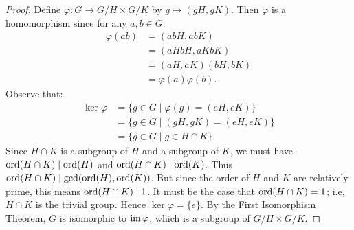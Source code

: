 \documentclass[10pt,twoside,openany]{memoir}
\begin{document}
    \begin{proof}
        Define $\varphi:G \rightarrow G/H \times G/K$ by $g \mapsto (gH,gK)$. Then $\varphi$ is a homomorphism since for any $a,b \in G$:
            \begin{equation*}
            \begin{split}
                \varphi(ab)
                & = (abH,abK) \\
                & = (aHbH,aKbK) \\
                & = (aH,aK)(bH,bK) \\
                & = \varphi(a)\varphi(b).
            \end{split}
            \end{equation*}
        Observe that:
            \begin{equation*}
            \begin{split}
                \ker \varphi 
                & = \{g \in G \mid \varphi(g) = (eH,eK)\} \\
                & = \{g \in G \mid (gH,gK) = (eH,eK)\} \\
                & = \{g \in G \mid g \in H \cap K\}.
            \end{split}
            \end{equation*}
        Since $H \cap K$ is a subgroup of $H$ and a subgroup of $K$, we must have $\operatorname{ord}(H \cap K) \mid \operatorname{ord}(H)$ and $\operatorname{ord}(H \cap K) \mid \operatorname{ord}(K)$. Thus $\operatorname{ord}(H \cap K) \mid \gcd(\operatorname{ord}(H),\operatorname{ord}(K))$. But since the order of $H$ and $K$ are relatively prime, this means $\operatorname{ord}(H \cap K) \mid 1$. It must be the case that $\operatorname{ord}(H \cap K) = 1$; i.e, $H \cap K$ is the trivial group. Hence $\ker \varphi = \{e\}$. By the First Isomorphism Theorem, $G$ is isomorphic to $\operatorname{im}\varphi$, which is a subgroup of $G/H \times G/K$.
    \end{proof}

\end{document}
